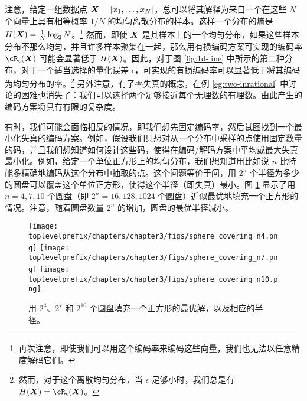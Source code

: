 \documentclass[../../book-main.tex]{subfiles}
\begin{document}
\begin{remark}
	注意，给定一组数据点 $\bm{X} = [\bm{x}_1,\ldots, \bm{x}_N]$，总可以将其解释为来自一个在这些 $N$ 个向量上具有相等概率 $1/N$ 的均匀离散分布的样本。这样一个分布的熵是 $H(\bm{X}) = \frac{1}{N}\log_2 N$。\footnote{再次注意，即使我们可以用这个编码率来编码这些向量，我们也无法以任意精度解码它们。} 然而，即使 $\bm{X}$ 是其样本上的一个均匀分布，如果这些样本分布不那么均匀，并且许多样本聚集在一起，那么用有损编码方案可实现的编码率 $\cR_{\epsilon}(\X)$ 可能会显著低于 $H(\bm{X})$。因此，对于图 \ref{fig:1d-line} 中所示的第二种分布，对于一个适当选择的量化误差 $\epsilon$，可实现的有损编码率可以显著低于将其编码为均匀分布的率。\footnote{然而，对于这个离散均匀分布，当 $\epsilon$ 足够小时，我们总是有 $H(\X) = \cR_{\epsilon}(\X)$。} 另外注意，有了率失真的概念，在例 \ref{eg:two-inrational} 中讨论的困难也消失了：我们可以选择两个足够接近每个无理数的有理数。由此产生的编码方案将具有有限的复杂度。
\end{remark}

\begin{example}\label{example:sphere-covering-rate-distortion}
	有时，我们可能会面临相反的情况，即我们想先固定编码率，然后试图找到一个最小化失真的编码方案。例如，假设我们只想对从一个分布中采样的点使用固定数量的码，并且我们想知道如何设计这些码，使得在编码/解码方案中平均或最大失真最小化。例如，给定一个单位正方形上的均匀分布，我们想知道用比如说 $n$ 比特能多精确地编码从这个分布中抽取的点。这个问题等价于问，用 $2^n$ 个半径为多少的圆盘可以覆盖这个单位正方形，使得这个半径（即失真）最小。图 \ref{fig:seven-circles-packing} 显示了用 \(n = 4, 7, 10\) 个圆盘（即 \(2^{n} = 16, 128, 1024\) 个圆盘）近似最优地填充一个正方形的情况。注意，随着圆盘数量 \(2^{n}\) 的增加，圆盘的最优半径减小。
	\begin{figure}
		\centering
		\texttt{[image: \\toplevelprefix/chapters/chapter3/figs/sphere\_covering\_n4.png]}
		\hfill
		\texttt{[image: \\toplevelprefix/chapters/chapter3/figs/sphere\_covering\_n7.png]}
		\hfill
		\texttt{[image: \\toplevelprefix/chapters/chapter3/figs/sphere\_covering\_n10.png]}

		\caption{用 \(2^{4}\)、\(2^{7}\) 和 \(2^{10}\) 个圆盘填充一个正方形的最优解，以及相应的半径。}
		\label{fig:seven-circles-packing}
	\end{figure}

\end{example}
\end{document}

